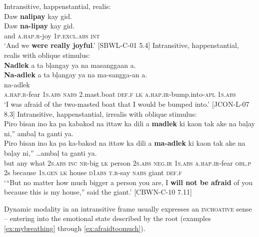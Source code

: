\ea
\label{ex:joyful}
Intransitive, happenstantial, realis: \\
Daw  \textbf{nalipay}  kay  gid. \\\smallskip
\gll Daw  \textbf{na-lipay}  kay  gid. \\
and  \textsc{a.hap.r}-joy  1\textsc{p.excl.abs}  \textsc{int} \\
\glt ‘And we \textbf{were really joyful}.’ [SBWL-C-01 5.4]
\z
\ea
\label{ex:bumpedinto}
Intransitive, happenstantial, realis with oblique stimulus: \\
\textbf{Nadlek}  a  ta  bļangay  ya  na  masanggaan a. \\\smallskip
\gll \textbf{Na-adlek}  a  ta  bļangay  ya  na  ma-sangga-an a. \\
na-adlek \\
\textsc{a.hap.r}-fear  1\textsc{s.abs}  \textsc{nabs}  2.mast.boat  \textsc{def.f}  \textsc{lk}  \textsc{a.hap.ir}-bump.into-\textsc{apl} 1\textsc{s.abs} \\
\glt ‘I was afraid of the two-masted boat that I would be bumped into.’ [JCON-L-07 8.3]
\z
\ea
\label{ex:saidthegiant}
Intransitive, happenstantial, irrealis with oblique stimulus: \\
Piro  bisan  ino  ka  pa  kabakod  na  ittaw  ka  dili  a \textbf{madlek}  ki  kaon  tak  ake  na  baļay  ni,”  ambaļ  ta ganti  ya.\\\smallskip
\gll Piro  bisan  ino  ka  pa  ka-bakod  na  ittaw  ka  dili  a \textbf{ma-adlek}  ki  kaon  tak  ake  na  baļay  ni,”   …ambaļ  ta ganti  ya.\\
but  any  what  2\textsc{s.abs}  \textsc{inc}  \textsc{nr}-big  \textsc{lk}  person  2\textsc{s.abs}  \textsc{neg.ir}  1\textsc{s.abs}
\textsc{a.hap.ir}-fear  \textsc{obl.p}  2s  because  1\textsc{s.gen}  \textsc{lk}  house  \textsc{d1abs}  \textsc{t.r}-say  \textsc{nabs} giant  \textsc{def.f} \\
\glt ‘“But no matter how much bigger a person you are, I \textbf{will not be afraid} of you because this is my house,” said the giant.’ [CBWN-C-10 7.11]
\z

Dynamic modality in an intransitive frame usually expresses an \textsc{inchoative} sense – entering into the emotional state described by the root (examples \ref{ex:mybreathing} through \ref{ex:afraidtoomuch}). 

